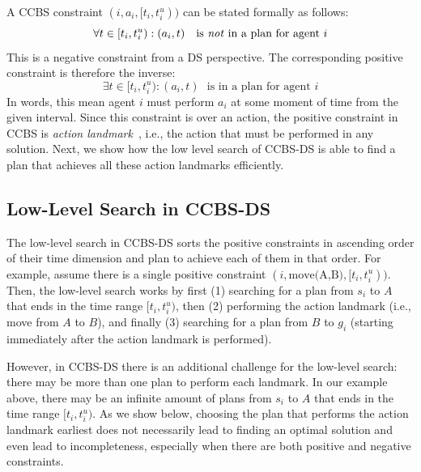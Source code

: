 \documentclass[letterpaper]{article} %
\newcommand{\ccbs}{\ac{CCBS}\xspace}
\newcommand{\ccbsds}{\ac{CCBS-DS}\xspace}
\newcommand{\ds}{\ac{DS}\xspace}
\begin{document}
A \ccbs constraint $(i, a_i, [t_i, t_i^u))$ can be stated formally as follows:
\[
\forall t\in [t_i, t_i^u): (a_i, t) ~~~ \text{is \emph{not} in a plan for agent $i$}
\]
This is a negative constraint from a \ds perspective.
The corresponding positive constraint is therefore the inverse: %
\[
\exists t\in [t_i, t_i^u): (a_i, t) ~~~ \text{is in a plan for agent $i$}
\]
In words, this mean agent $i$ must perform $a_i$ at some moment of time from the given interval. 
Since this constraint is over an action, the positive constraint in \ccbs is \emph{action landmark}~\cite{karpas2009cost}, 
i.e., the action that must be performed in any solution. Next, we show how the low level search of \ccbsds is able to find a plan that achieves all these action landmarks efficiently. 

\subsection{Low-Level Search in \ccbsds}

The low-level search in \ccbsds sorts the positive constraints in ascending order of their time dimension and plan to achieve each of them in that order. 
For example, assume there is a single positive constraint $(i, \text{move(A,B)}, [t_i, t_i^u))$.  
Then, the low-level search works by first 
(1) searching for a plan from $s_i$ to $A$ that ends in the time range $[t_i, t_i^u)$, 
then (2) performing the action landmark (i.e., move from $A$ to $B$),
and finally (3) searching for a plan from $B$ to $g_i$ (starting immediately after the action landmark is performed). 


However, in \ccbsds there is an additional challenge for the low-level search: there may be more than one plan to perform each landmark. 
In our example above, there may be an infinite amount of plans from $s_i$ to $A$  that ends in the time range $[t_i, t_i^u)$. 
As we show below, choosing the plan that performs the action landmark earliest does not necessarily lead to finding an optimal solution and even lead to incompleteness, especially when there are both positive and negative constraints. 
\end{document}

